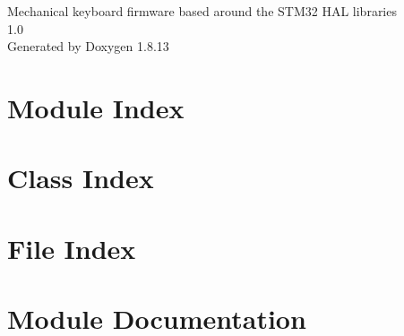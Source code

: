 \documentclass[twoside]{book}
\newcommand{\+}{\discretionary{\mbox{\scriptsize$\hookleftarrow$}}{}{}}
\newcommand{\clearemptydoublepage}{%
  \newpage{\pagestyle{empty}\cleardoublepage}%
}
\begin{document}
\hypersetup{pageanchor=false,
             bookmarksnumbered=true,
             pdfencoding=unicode
            }
\begin{titlepage}
\vspace*{7cm}
\begin{center}%
{\Large Mechanical keyboard firmware based around the S\+T\+M32 H\+AL libraries \\[1ex]\large 1.\+0 }\\
\vspace*{1cm}
{\large Generated by Doxygen 1.8.13}\\
\end{center}
\end{titlepage}
\clearemptydoublepage
{}
\tableofcontents
\clearemptydoublepage
{}
\hypersetup{pageanchor=true}

\chapter{Module Index}

\chapter{Class Index}

\chapter{File Index}

\chapter{Module Documentation}
































\end{document}
